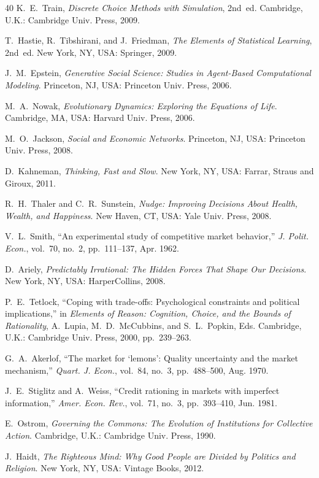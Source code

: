 \documentclass[journal]{IEEEtran}
\begin{document}
\begin{thebibliography}{40}
K.~E.~Train, \emph{Discrete Choice Methods with Simulation}, 2nd~ed.
Cambridge, U.K.: Cambridge Univ. Press, 2009.

T.~Hastie, R.~Tibshirani, and J.~Friedman, \emph{The Elements of Statistical Learning}, 2nd~ed.
New York, NY, USA: Springer, 2009.

J.~M.~Epstein, \emph{Generative Social Science: Studies in Agent-Based Computational Modeling}.
Princeton, NJ, USA: Princeton Univ. Press, 2006.

M.~A.~Nowak, \emph{Evolutionary Dynamics: Exploring the Equations of Life}.
Cambridge, MA, USA: Harvard Univ. Press, 2006.

M.~O.~Jackson, \emph{Social and Economic Networks}.
Princeton, NJ, USA: Princeton Univ. Press, 2008.

D.~Kahneman, \emph{Thinking, Fast and Slow}.
New York, NY, USA: Farrar, Straus and Giroux, 2011.

R.~H.~Thaler and C.~R.~Sunstein, \emph{Nudge: Improving Decisions About Health, Wealth, and Happiness}.
New Haven, CT, USA: Yale Univ. Press, 2008.

V.~L.~Smith, ``An experimental study of competitive market behavior,''
\emph{J. Polit. Econ.}, vol.~70, no.~2, pp.~111--137, Apr. 1962.

D.~Ariely, \emph{Predictably Irrational: The Hidden Forces That Shape Our Decisions}.
New York, NY, USA: HarperCollins, 2008.

P.~E.~Tetlock, ``Coping with trade-offs: Psychological constraints and political implications,''
in \emph{Elements of Reason: Cognition, Choice, and the Bounds of Rationality},
A.~Lupia, M.~D.~McCubbins, and S.~L.~Popkin, Eds.
Cambridge, U.K.: Cambridge Univ. Press, 2000, pp.~239--263.

G.~A.~Akerlof, ``The market for `lemons': Quality uncertainty and the market mechanism,''
\emph{Quart. J. Econ.}, vol.~84, no.~3, pp.~488--500, Aug. 1970.

J.~E.~Stiglitz and A.~Weiss, ``Credit rationing in markets with imperfect information,''
\emph{Amer. Econ. Rev.}, vol.~71, no.~3, pp.~393--410, Jun. 1981.

E.~Ostrom, \emph{Governing the Commons: The Evolution of Institutions for Collective Action}.
Cambridge, U.K.: Cambridge Univ. Press, 1990.

J.~Haidt, \emph{The Righteous Mind: Why Good People are Divided by Politics and Religion}.
New York, NY, USA: Vintage Books, 2012.

\end{thebibliography}
\end{document}
